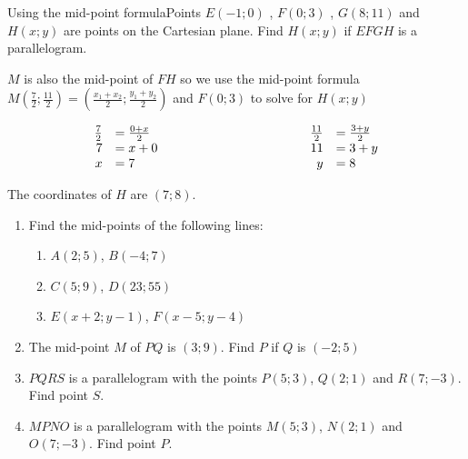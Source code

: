 \begin{wex}{Using the mid-point formula}{Points $E(-1;0)$ , $F(0;3)$ , $G(8;11)$ and $H(x;y)$ are points on the Cartesian plane. Find $H(x;y)$ if $EFGH$ is a parallelogram.}
{
$M$ is also the mid-point of $FH$ so we use the mid-point formula
$M(\frac{7}{2};\frac{11}{2}) = \left(\frac{x_1+x_2}{2}; \frac{y_1+y_2}{2}\right)$ and $F(0;3)$ to solve for $H(x;y)$

\begin{equation*}
\begin{array}{rllrl}
\frac{7}{2}&=\frac{0+x}{2}&\hskip10em&\frac{11}{2}&=\frac{3+y}{2}\\
7&=x+0&&11&=3+y\\
x&=7&&y&=8\\
\end{array}
\end{equation*}

The coordinates of $H$ are $(7;8)$.
}
\end{wex}


\begin{exercises}{}
{
\begin{enumerate}[itemsep=5pt, label=\textbf{\arabic*}. ]
\item Find the mid-points of the following lines:
    \begin{enumerate}[noitemsep, label=\textbf{(\alph*)} ]
    \item $A(2;5)$, $B(-4;7)$
    \item $C(5;9)$, $D(23;55)$
    \item $E(x+2;y-1)$, $F(x-5;y-4)$
    \end{enumerate}

\item The mid-point $M$ of $PQ$ is $(3;9)$. Find $P$ if $Q$ is $(-2;5)$

\item $PQRS$ is a parallelogram with the points $P(5;3)$, $Q(2;1)$ and $R(7;-3)$. Find point $S$.

\item $MPNO$ is a parallelogram with the points $M(5;3)$, $N(2;1)$ and $O(7;-3)$. Find point $P$.
\end{enumerate}

}
\end{exercises}    

